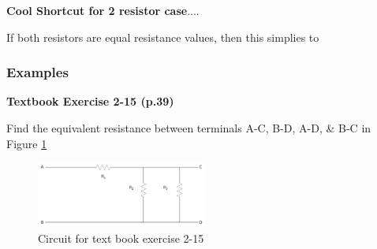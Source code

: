 \documentclass{handout}
\begin{document}
\textbf{Cool Shortcut for 2 resistor case}....


If both resistors are equal resistance values, then this simplies to 


\pagebreak

\subsubsection{Examples}
\textbf{Textbook Exercise 2-15 (p.39)}

Find the equivalent resistance between terminals A-C, B-D, A-D, \& B-C in Figure \ref{fig: Ex2_15}

\begin{figure}[h t b]
\centering
\includegraphics[width=0.5\textwidth]{Ex2_15.jpg}
\caption{Circuit for text book exercise 2-15}
\label{fig: Ex2_15}
\end{figure}

\end{document}
